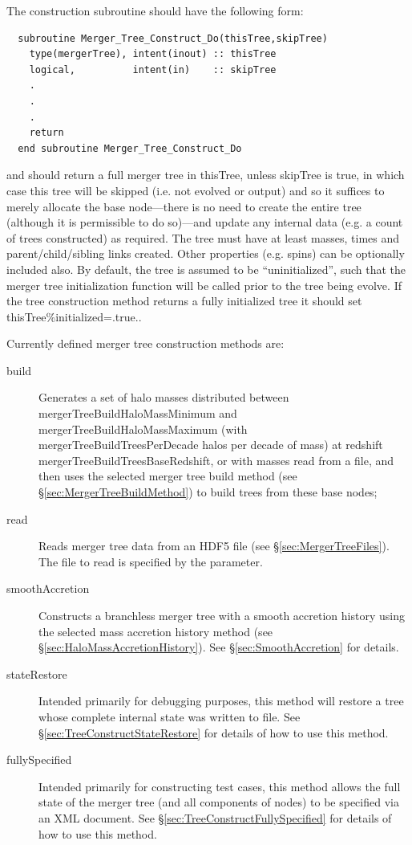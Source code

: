 The construction subroutine should have the following form:
\begin{verbatim}
  subroutine Merger_Tree_Construct_Do(thisTree,skipTree)
    type(mergerTree), intent(inout) :: thisTree
    logical,          intent(in)    :: skipTree
    .
    .
    .
    return
  end subroutine Merger_Tree_Construct_Do
\end{verbatim}
and should return a full merger tree in {\normalfont \ttfamily thisTree}, unless {\normalfont \ttfamily skipTree} is true, in which case this tree will be skipped (i.e. not evolved or output) and so it suffices to merely allocate the base node---there is no need to create the entire tree (although it is permissible to do so)---and update any internal data (e.g. a count of trees constructed) as required. The tree must have at least masses, times and parent/child/sibling links created. Other properties (e.g. spins) can be optionally included also. By default, the tree is assumed to be ``uninitialized'', such that the merger tree initialization function will be called prior to the tree being evolve. If the tree construction method returns a fully initialized tree it should set {\normalfont \ttfamily thisTree\%initialized=.true.}.

Currently defined merger tree construction methods are:
\begin{description}
 \item [{\normalfont \ttfamily build}] Generates a set of halo masses distributed between {\normalfont \ttfamily mergerTreeBuildHaloMassMinimum} and {\normalfont \ttfamily mergerTreeBuildHaloMassMaximum} (with {\normalfont \ttfamily mergerTreeBuildTreesPerDecade} halos per decade of mass) at redshift {\normalfont \ttfamily mergerTreeBuildTreesBaseRedshift}, or with masses read from a file, and then uses the selected merger tree build method (see \S\ref{sec:MergerTreeBuildMethod}) to build trees from these base nodes;
 \item [{\normalfont \ttfamily read}] Reads merger tree data from an HDF5 file (see \S\ref{sec:MergerTreeFiles}). The file to read is specified by the {\normalfont \ttfamily [mergerTreeReadFileName]} parameter.
 \item [{\normalfont \ttfamily smoothAccretion}] Constructs a branchless merger tree with a smooth accretion history using the selected mass accretion history method (see \S\ref{sec:HaloMassAccretionHistory}). See \S\ref{sec:SmoothAccretion} for details.
 \item [{\normalfont \ttfamily stateRestore}] Intended primarily for debugging purposes, this method will restore a tree whose complete internal state was written to file. See \S\ref{sec:TreeConstructStateRestore} for details of how to use this method.
 \item [{\normalfont \ttfamily fullySpecified}] Intended primarily for constructing test cases, this method allows the full state of the merger tree (and all components of nodes) to be specified via an XML document. See \S\ref{sec:TreeConstructFullySpecified} for details of how to use this method.
\end{description}

